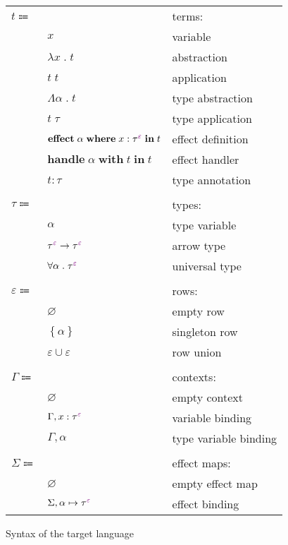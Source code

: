 \documentclass[12pt]{article}
\newcommand\anno[2]{#1 : #2}
\newcommand\term{t}
\newcommand\eVar{x}
\newcommand\eAbs[2]{\lambda #1 \; . \; #2}
\newcommand\eApp[2]{#1 \; #2}
\newcommand\eTAbs[2]{\Lambda #1 \; . \; #2}
\newcommand\eTApp[2]{#1 \; #2}
\newcommand\eHandle[3]{\textbf{handle} \; #1 \; \textbf{with} \; #2 \; \textbf{in} \; #3}
\newcommand\eEffect[5]{\textbf{effect} \; #1 \; \textbf{where} \; \anno{#2}{\tEmbellished{#3}{#4}} \; \textbf{in} \; #5}
\newcommand\eAnno[2]{\anno{#1}{#2}}
\newcommand\type{\tau}
\newcommand\tVar{\alpha}
\newcommand\tArrow[4]{\tEmbellished{#1}{#2} \rightarrow \tEmbellished{#3}{#4}}
\newcommand\tForall[3]{\forall #1 \; . \; \tEmbellished{#2}{#3}}
\newcommand\tEmbellished[2]{{#1}^{\textcolor{violet}{#2}}}
\newcommand\row{\varepsilon}
\newcommand\rEmpty{\varnothing}
\newcommand\rSingleton[1]{\left\{ #1 \right\}}
\newcommand\rUnion[2]{#1 \cup #2}
\newcommand\context{\Gamma}
\newcommand\cEmpty{\varnothing}
\newcommand\cTExtend[4]{#1, \anno{#2}{\tEmbellished{#3}{#4}}}
\newcommand\cKExtend[2]{#1, #2}
\newcommand\effectMap{\Sigma}
\newcommand\emEmpty{\varnothing}
\newcommand\emExtend[4]{#1, #2 \mapsto \tEmbellished{#3}{#4}}
\begin{document}
        \begin{figure}[H]
          \begin{mdframed}[backgroundcolor=none]
            \begin{center}
              \begin{tabular}{l l l}
                $\term \Coloneqq$ & & terms: \\
                & $\eVar$ & variable \\
                & $\eAbs{\eVar}{\term}$ & abstraction \\
                & $\eApp{\term}{\term}$ & application \\
                & $\eTAbs{\tVar}{\term}$ & type abstraction \\
                & $\eTApp{\term}{\type}$ & type application \\
                & $\eEffect{\tVar}{\eVar}{\type}{\row}{\term}$ & effect definition \\
                & $\eHandle{\tVar}{\term}{\term}$ & effect handler \\
                & $\eAnno{\term}{\type}$ & type annotation \\
                \\
                $\type \Coloneqq$ & & types: \\
                & $\tVar$ & type variable \\
                & $\tArrow{\type}{\row}{\type}{\row}$ & arrow type \\
                & $\tForall{\tVar}{\type}{\row}$ & universal type \\
                \\
                $\row \Coloneqq$ & & rows: \\
                & $\rEmpty$ & empty row \\
                & $\rSingleton{\tVar}$ & singleton row \\
                & $\rUnion{\row}{\row}$ & row union \\
                \\
                $\context \Coloneqq$ & & contexts: \\
                & $\cEmpty$ & empty context \\
                & $\cTExtend{\context}{\eVar}{\type}{\row}$ & variable binding \\
                & $\cKExtend{\context}{\tVar}$ & type variable binding \\
                \\
                $\effectMap \Coloneqq$ & & effect maps: \\
                & $\emEmpty$ & empty effect map \\
                & $\emExtend{\effectMap}{\tVar}{\type}{\row}$ & effect binding \\
              \end{tabular}
            \end{center}

            \caption{Syntax of the target language}\label{fig:target_syntax}
          \end{mdframed}
        \end{figure}
\end{document}
